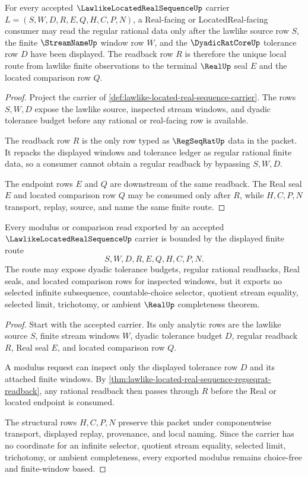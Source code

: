 \begin{theorem}
\label{thm:lawlike-located-real-sequence-regseqrat-readback}
For every accepted $\LawlikeLocatedRealSequenceUp$ carrier $L=(S,W,D,R,E,Q,H,C,P,N)$, a Real-facing or LocatedReal-facing consumer may read the regular rational data only after the lawlike source row $S$, the finite $\StreamNameUp$ window row $W$, and the $\DyadicRatCoreUp$ tolerance row $D$ have been displayed. The readback row $R$ is therefore the unique local route from lawlike finite observations to the terminal $\RealUp$ seal $E$ and the located comparison row $Q$.
\end{theorem}
\begin{proof}
Project the carrier of \autoref{def:lawlike-located-real-sequence-carrier}. The rows $S,W,D$ expose the lawlike source, inspected stream windows, and dyadic tolerance budget before any rational or real-facing row is available.

The readback row $R$ is the only row typed as $\RegSeqRatUp$ data in the packet. It repacks the displayed windows and tolerance ledger as regular rational finite data, so a consumer cannot obtain a regular readback by bypassing $S,W,D$.

The endpoint rows $E$ and $Q$ are downstream of the same readback. The Real seal $E$ and located comparison row $Q$ may be consumed only after $R$, while $H,C,P,N$ transport, replay, source, and name the same finite route.
\end{proof}

\begin{theorem}
\label{thm:lawlike-located-real-sequence-choice-free-modulus}
Every modulus or comparison read exported by an accepted $\LawlikeLocatedRealSequenceUp$ carrier is bounded by the displayed finite route
$$
S,W,D,R,E,Q,H,C,P,N.
$$
The route may expose dyadic tolerance budgets, regular rational readbacks, Real seals, and located comparison rows for inspected windows, but it exports no selected infinite subsequence, countable-choice selector, quotient stream equality, selected limit, trichotomy, or ambient $\RealUp$ completeness theorem.
\end{theorem}
\begin{proof}
Start with the accepted carrier. Its only analytic rows are the lawlike source $S$, finite stream windows $W$, dyadic tolerance budget $D$, regular readback $R$, Real seal $E$, and located comparison row $Q$.

A modulus request can inspect only the displayed tolerance row $D$ and its attached finite windows. By \autoref{thm:lawlike-located-real-sequence-regseqrat-readback}, any rational readback then passes through $R$ before the Real or located endpoint is consumed.

The structural rows $H,C,P,N$ preserve this packet under componentwise transport, displayed replay, provenance, and local naming. Since the carrier has no coordinate for an infinite selector, quotient stream equality, selected limit, trichotomy, or ambient completeness, every exported modulus remains choice-free and finite-window based.
\end{proof}

